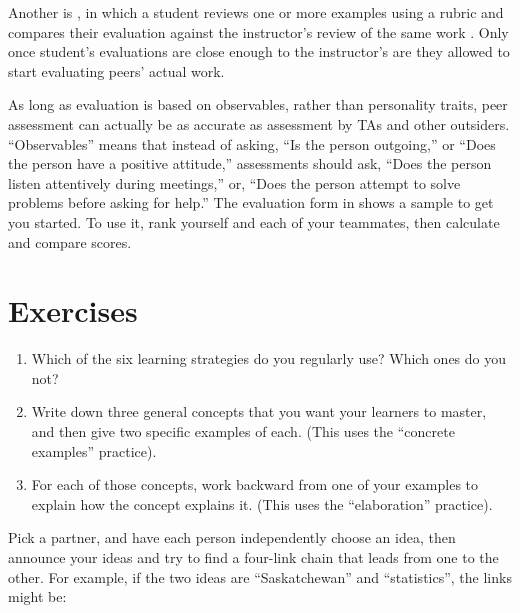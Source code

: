Another is , in which a student reviews one or more examples using a
rubric and compares their evaluation against the instructor's review
of the same work \cite{Kulk2013}.  Only once student's evaluations are
close enough to the instructor's are they allowed to start evaluating
peers' actual work.

As long as evaluation is based on observables, rather than personality
traits, peer assessment can actually be as accurate as assessment by
TAs and other outsiders.  ``Observables'' means that instead of
asking, ``Is the person outgoing,'' or ``Does the person have a
positive attitude,'' assessments should ask, ``Does the person listen
attentively during meetings,'' or, ``Does the person attempt to solve
problems before asking for help.''  The evaluation form in
 shows a sample to get you started.  To use it,
rank yourself and each of your teammates, then calculate and compare
scores.

\section{Exercises}\label{s:individual-exercises}


\begin{enumerate}

\item
  Which of the six learning strategies do you regularly use? Which
  ones do you not?

\item
  Write down three general concepts that you want your learners to
  master, and then give two specific examples of each. (This uses the
  ``concrete examples'' practice).

\item
  For each of those concepts, work backward from one of your examples
  to explain how the concept explains it. (This uses the
  ``elaboration'' practice).

\end{enumerate}


Pick a partner, and have each person independently choose an idea,
then announce your ideas and try to find a four-link chain that leads
from one to the other.  For example, if the two ideas are
``Saskatchewan'' and ``statistics'', the links might be:

